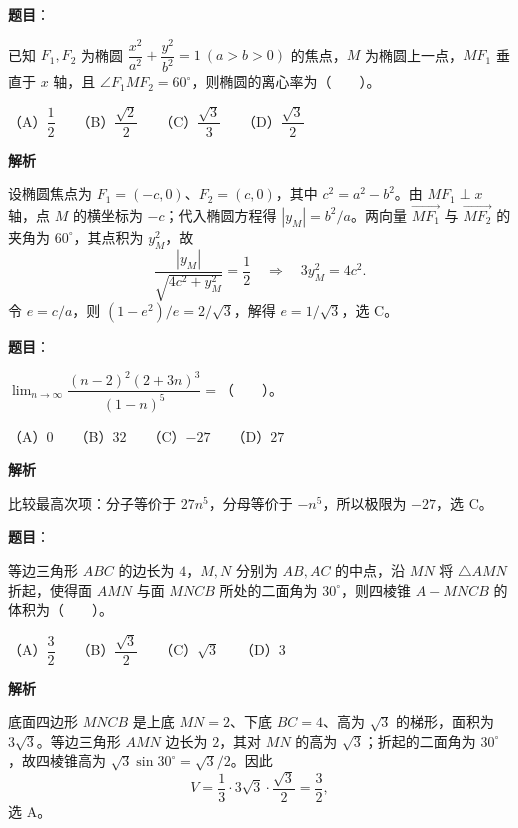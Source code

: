 \begin{answer}

\textbf{题目}：

已知 $F_1,F_2$ 为椭圆 $\dfrac{x^2}{a^2}+\dfrac{y^2}{b^2}=1\ (a>b>0)$ 的焦点，$M$ 为椭圆上一点，$MF_1$ 垂直于 $x$ 轴，且 $\angle F_1MF_2=60^\circ$，则椭圆的离心率为\mbox{（　　）}。

（A）$\dfrac{1}{2}$　　（B）$\dfrac{\sqrt{2}}{2}$　　（C）$\dfrac{\sqrt{3}}{3}$　　（D）$\dfrac{\sqrt{3}}{2}$

\textbf{解析}

设椭圆焦点为 $F_1=(-c,0)$、$F_2=(c,0)$，其中 $c^2=a^2-b^2$。由 $MF_1\perp x$ 轴，点 $M$ 的横坐标为 $-c$；代入椭圆方程得 $|y_M|=b^2/a$。两向量 $\overrightarrow{MF_1}$ 与 $\overrightarrow{MF_2}$ 的夹角为 $60^\circ$，其点积为 $y_M^2$，故
\nopagebreak[4]
\[
\frac{|y_M|}{\sqrt{4c^2+y_M^2}}=\frac12
\quad\Longrightarrow\quad 3y_M^2=4c^2.
\]
令 $e=c/a$，则 $(1-e^2)/e=2/\sqrt3$，解得 $e=1/\sqrt3$，选 C。


\end{answer}
\begin{answer}

\textbf{题目}：

$\displaystyle\lim_{n\to\infty}\dfrac{(n-2)^2(2+3n)^3}{(1-n)^5}=$\mbox{（　　）}。

（A）$0$　　（B）$32$　　（C）$-27$　　（D）$27$

\textbf{解析}

比较最高次项：分子等价于 $27n^5$，分母等价于 $-n^5$，所以极限为 $-27$，选 C。


\end{answer}
\begin{answer}

\textbf{题目}：

等边三角形 $ABC$ 的边长为 $4$，$M,N$ 分别为 $AB,AC$ 的中点，沿 $MN$ 将 $\triangle AMN$ 折起，使得面 $AMN$ 与面 $MNCB$ 所处的二面角为 $30^\circ$，则四棱锥 $A-MNCB$ 的体积为\mbox{（　　）}。

（A）$\dfrac{3}{2}$　　（B）$\dfrac{\sqrt{3}}{2}$　　（C）$\sqrt{3}$　　（D）$3$

\textbf{解析}

底面四边形 $MNCB$ 是上底 $MN=2$、下底 $BC=4$、高为 $\sqrt3$ 的梯形，面积为 $3\sqrt3$。等边三角形 $AMN$ 边长为 $2$，其对 $MN$ 的高为 $\sqrt3$；折起的二面角为 $30^\circ$，故四棱锥高为 $\sqrt3\sin30^\circ=\sqrt3/2$。因此
\nopagebreak[4]
\[
V=\frac13\cdot3\sqrt3\cdot\frac{\sqrt3}{2}=\frac32,
\]
选 A。


\end{answer}
